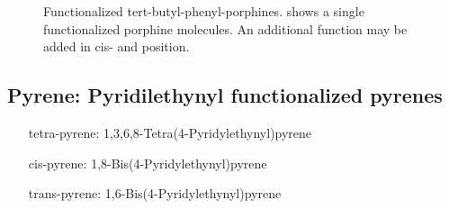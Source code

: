 \begin{figure}[]\centering
	\caption{Functionalized tert-butyl-phenyl-porphines.  shows a single functionalized porphine molecules. An additional function may be added in  cis-  and  position.}
	\label{fig:TBP}
\end{figure}
\subsection{Pyrene: Pyridilethynyl functionalized pyrenes}
\label{sec:pyrene}
\begin{itemize}
	\item[tetra-pyrene:] 1,3,6,8-Tetra(4-Pyridylethynyl)pyrene
	\item[cis-pyrene:] 1,8-Bis(4-Pyridylethynyl)pyrene
	\item[trans-pyrene:] 1,6-Bis(4-Pyridylethynyl)pyrene
\end{itemize}

